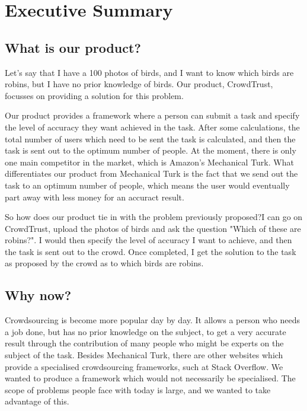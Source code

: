 \documentclass[11pt]{article}
\begin{document}
\newpage

\tableofcontents	%

\newpage


\section{Executive Summary}

\subsection{What is our product?}
Let's say that I have a 100 photos of birds, and I want to know which birds are 
robins, but I have no prior knowledge of birds. Our product, CrowdTrust, focusses
on providing a solution for this problem.

Our product provides a framework where a person can submit a task and specify
the level of accuracy they want achieved in the task. After some calculations,
the total number of users which need to be sent the task is calculated, and
then the task is sent out to the optimum number of people. At the moment,
there is only one main competitor in the market, which is Amazon's Mechanical
Turk. What differentiates our product from Mechanical Turk is the fact that
we send out the task to an optimum number of people, which means the user
would eventually part away with less money for an accuract result.

So how does our product tie in with the problem previously proposed?I can go on 
CrowdTrust, upload the photos of birds and ask the question "Which of these are 
robins?". I would then specify the level of accuracy I want to achieve, and then 
the task is sent out to the crowd. Once completed, I get the solution to the 
task as proposed by the crowd as to which birds are robins.

\subsection{Why now?}
Crowdsourcing is become more popular day by day. It allows a person who needs
a job done, but has no prior knowledge on the subject, to get a very accurate
result through the contribution of many people who might be experts on the
subject of the task. Besides Mechanical Turk, there are other websites which
provide a specialised crowdsourcing frameworks, such at Stack Overflow. We wanted
to produce a framework which would not necessarily be specialised. The scope of
problems people face with today is large, and we wanted to take advantage of this.
\end{document}
